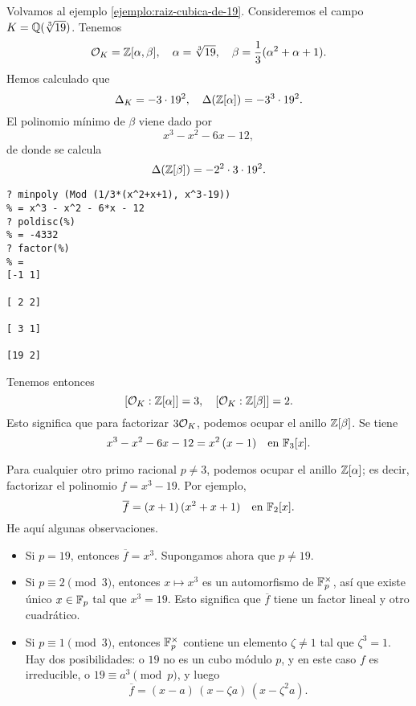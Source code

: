 \begin{ejemplo}
  \label{ejemplo:raiz-cubica-de-19-factorizacion}
  Volvamos al ejemplo \ref{ejemplo:raiz-cubica-de-19}.
  Consideremos el campo $K = \mathbb{Q} (\sqrt[3]{19})$. Tenemos
  \[ \mathcal{O}_K = \mathbb{Z} [\alpha,\beta], \quad
     \alpha = \sqrt[3]{19}, \quad
     \beta = \frac{1}{3} (\alpha^2 + \alpha + 1). \]
  Hemos calculado que
  \[ \Delta_K = - 3\cdot 19^2, \quad
     \Delta (\mathbb{Z} [\alpha]) = - 3^3\cdot 19^2. \]
  El polinomio mínimo de $\beta$ viene dado por
  $$x^3 - x^2 - 6x - 12,$$
  de donde se calcula
  \[ \Delta (\mathbb{Z} [\beta]) = - 2^2 \cdot 3 \cdot 19^2. \]

  \begin{shaded}
\begin{verbatim}
? minpoly (Mod (1/3*(x^2+x+1), x^3-19))
% = x^3 - x^2 - 6*x - 12
? poldisc(%)
% = -4332
? factor(%)
% =
[-1 1]

[ 2 2]

[ 3 1]

[19 2]
\end{verbatim}
\end{shaded}

  Tenemos entonces
  $$[\mathcal{O}_K : \mathbb{Z} [\alpha]] = 3, \quad [\mathcal{O}_K : \mathbb{Z} [\beta]] = 2.$$
  Esto significa que para factorizar $3\mathcal{O}_K$, podemos ocupar el anillo
  $\mathbb{Z} [\beta]$. Se tiene
  $$x^3 - x^2 - 6x - 12 = x^2\,(x - 1) \quad\text{en }\mathbb{F}_3[x].$$

  Para cualquier otro primo racional $p \ne 3$, podemos ocupar el anillo
  $\mathbb{Z} [\alpha]$; es decir, factorizar el polinomio $f = x^3 - 19$.
  Por ejemplo,
  $$\overline{f} = (x+1)\,(x^2 + x + 1) \quad\text{en }\mathbb{F}_2[x].$$
  He aquí algunas observaciones.

  \begin{itemize}
  \item Si $p = 19$, entonces $\overline{f} = x^3$. Supongamos ahora que
    $p \ne 19$.

  \item Si $p \equiv 2 \pmod{3}$, entonces $x \mapsto x^3$ es un automorfismo de
    $\mathbb{F}_p^\times$, así que existe único $x \in \mathbb{F}_p$ tal que $x^3 = 19$. Esto
    significa que $\overline{f}$ tiene un factor lineal y otro cuadrático.

  \item Si $p \equiv 1 \pmod{3}$, entonces $\mathbb{F}_p^\times$ contiene un elemento
    $\zeta \ne 1$ tal que $\zeta^3 = 1$. Hay dos posibilidades: o $19$ no es un
    cubo módulo $p$, y en este caso $f$ es irreducible, o
    $19 \equiv a^3 \pmod{p}$, y luego
    $$\overline{f} = (x - a)\,(x - \zeta a)\,(x - \zeta^2 a).$$
  \end{itemize}


\end{ejemplo}
